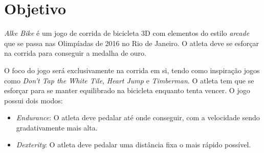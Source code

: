 \section{Objetivo} 

\textit{Alke Bike} é um jogo de corrida de bicicleta 3D com elementos do estilo \textit{arcade} que se passa nas Olimpíadas de 2016 no Rio de Janeiro. O atleta deve se esforçar na corrida para conseguir a medalha de ouro.

O foco do jogo será exclusivamente na corrida em si, tendo como inspiração jogos como \textit{Don't Tap the White Tile}, \textit{Heart Jump} e \textit{Timberman}. O atleta tem que se esforçar para se manter equilibrado na bicicleta enquanto tenta vencer. O jogo possui dois modos:
\begin{itemize}
\item{\textit{Endurance}}: O atleta deve pedalar até onde conseguir, com a velocidade sendo gradativamente mais alta.
\item{\textit{Dexterity}}: O atleta deve pedalar uma distância fixa o mais rápido possível.
\end{itemize}
